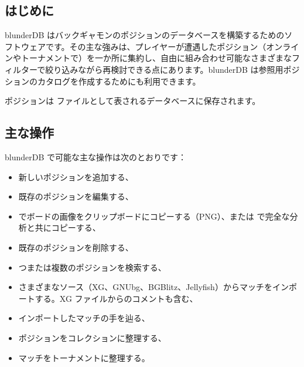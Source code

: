 \documentclass[letterpaper,10pt,dvipdfmx]{sphinxmanual}
\begin{document}
\subsection{はじめに}
\label{\detokenize{manuel:introduction}}
\sphinxAtStartPar
blunderDB はバックギャモンのポジションのデータベースを構築するためのソフトウェアです。その主な強みは、プレイヤーが遭遇したポジション（オンラインやトーナメントで）を一か所に集約し、自由に組み合わせ可能なさまざまなフィルターで絞り込みながら再検討できる点にあります。blunderDB は参照用ポジションのカタログを作成するためにも利用できます。

\sphinxAtStartPar
ポジションは  ファイルとして表されるデータベースに保存されます。


\subsection{主な操作}
\label{\detokenize{manuel:interactions-principales}}
\sphinxAtStartPar
blunderDB で可能な主な操作は次のとおりです：
\begin{itemize}
\item {} 
\sphinxAtStartPar
新しいポジションを追加する、

\item {} 
\sphinxAtStartPar
既存のポジションを編集する、

\item {} 
\sphinxAtStartPar
{} でボードの画像をクリップボードにコピーする（PNG）、または  で完全な分析と共にコピーする、

\item {} 
\sphinxAtStartPar
既存のポジションを削除する、

\item {} 
 つまたは複数のポジションを検索する、

\item {} 
\sphinxAtStartPar
さまざまなソース（XG、GNUbg、BGBlitz、Jellyfish）からマッチをインポートする。XG ファイルからのコメントも含む、

\item {} 
\sphinxAtStartPar
インポートしたマッチの手を辿る、

\item {} 
\sphinxAtStartPar
ポジションをコレクションに整理する、

\item {} 
\sphinxAtStartPar
マッチをトーナメントに整理する。

\end{itemize}
\end{document}
